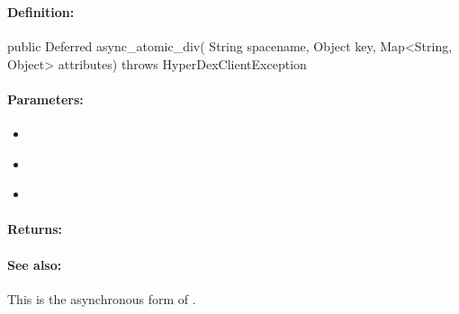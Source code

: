 \pagebreak
\subsubsection{}
\label{api:java:async_atomic_div}


\paragraph{Definition:}
\begin{javacode}
public Deferred async_atomic_div(
        String spacename,
        Object key,
        Map<String, Object> attributes) throws HyperDexClientException
\end{javacode}

\paragraph{Parameters:}
\begin{itemize}[noitemsep]
\item {}\\

\item {}\\

\item {}\\

\end{itemize}

\paragraph{Returns:}


\paragraph{See also:}  This is the asynchronous form of .

\pagebreak
\subsubsection{}
\label{api:java:uxact_atomic_div}


